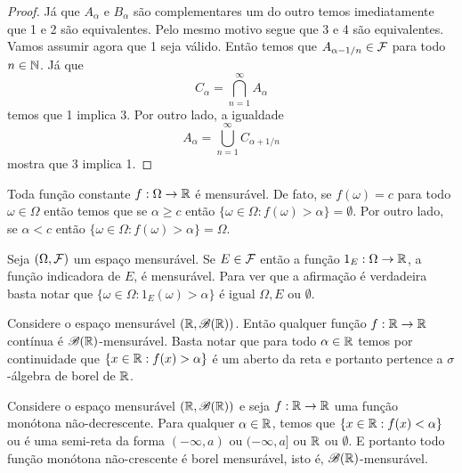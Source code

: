 \begin{proof}
	Já que $A_{\alpha}$ e $B_{\alpha}$ são complementares um do outro
	temos imediatamente que 1 e 2 são equivalentes. Pelo mesmo 
	motivo segue que 3 e 4 são equivalentes. Vamos assumir agora que 
	1 seja válido. Então temos que $A_{\alpha-1/n}\in \mathcal{F}$ para todo
	$n\in\mathbb{N}$. Já que 
	\[ 
		C_{\alpha} = \bigcap_{n=1}^{\infty} A_{\alpha} 
	\]
	temos que 1 implica 3. Por outro lado, a igualdade
	\[
		A_{\alpha} = \bigcup_{n=1}^{\infty} C_{\alpha+1/n}
	\]
	mostra que 3 implica 1.
\end{proof}



\begin{exemplo}\label{exemplo-func-const.mensuravel}
	Toda função constante $f:\Omega\to\mathbb{R}$ é mensurável.
	De fato, se $f(\omega)=c$ para todo $\omega\in\Omega$ 
	então temos que se $\alpha\geq c$ então 
	$\{\omega\in\Omega: f(\omega)>\alpha\} =\emptyset$.
	Por outro lado, se $\alpha<c$ então 
	$\{\omega\in\Omega: f(\omega)>\alpha\} =\Omega$.
\end{exemplo}





\begin{exemplo}
	Seja $(\Omega,\mathcal{F})$ um espaço mensurável. 
	Se $E\in\mathcal{F}$ então a função $1_E:\Omega\to\mathbb{R}$, a função indicadora de $E$,
	é mensurável.
	Para ver que a afirmação é verdadeira basta notar que 
	$\{\omega\in\Omega: 1_{E}(\omega)>\alpha \}$ é igual $\Omega, E$
	ou $\emptyset$.
\end{exemplo}



\begin{exemplo}
	Considere o espaço mensurável $(\mathbb{R},\mathscr{B}(\mathbb{R}))$. 
	Então qualquer função $f:\mathbb{R}\to\mathbb{R}$ contínua é 
	$\mathscr{B}(\mathbb{R})$-mensurável.
	Basta notar que para todo $\alpha\in \mathbb{R}$ temos
	por continuidade que $\{x\in\mathbb{R}: f(x)>\alpha\}$ é 
	um aberto da reta e portanto pertence a $\sigma$-álgebra
	de borel de $\mathbb{R}$.
\end{exemplo}




\begin{exemplo}
	Considere o espaço mensurável $(\mathbb{R},\mathscr{B}(\mathbb{R}))$ e 
	seja $f:\mathbb{R}\to\mathbb{R}$ uma função monótona não-decrescente.
	Para qualquer $\alpha\in\mathbb{R}$, 
	temos que $\{x\in\mathbb{R}: f(x)<\alpha\}$ ou é uma semi-reta
	da forma $(-\infty,a)$ ou $(-\infty,a]$ ou $\mathbb{R}$ ou $\emptyset$.
	E portanto todo função monótona não-crescente é borel 
	mensurável, isto é, $\mathscr{B}(\mathbb{R})$-mensurável.
\end{exemplo}


